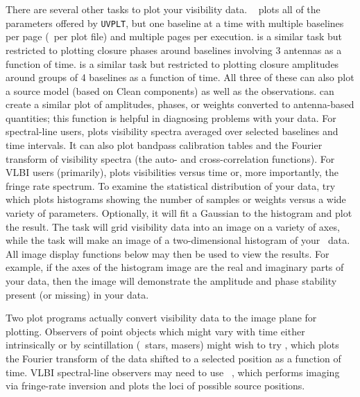      There are several other tasks to plot your visibility data.  {\tt
{}} plots all of the parameters offered by {\tt UVPLT}, but
one baseline at a time with multiple baselines per page (\ie\ per plot
file) and multiple pages per execution.  {\tt {}} is a
similar task but restricted to plotting closure phases around baselines
involving 3 antennas as a function of time.  {\tt {}} is a
similar task but restricted to plotting closure amplitudes around
groups of 4 baselines as a function of time.  All three of these
can also plot a source model (based on Clean components) as well as
the observations.  {\tt {}} can create a similar plot of
amplitudes, phases, or weights converted to antenna-based quantities;
this function is helpful in diagnosing problems with your data.  For
spectral-line users, {\tt {}} plots visibility spectra
averaged over selected baselines and time intervals.  It can also plot
bandpass calibration tables and the Fourier transform of visibility
spectra (the auto- and cross-correlation functions).  For VLBI users
(primarily), {\tt {}} plots visibilities versus time or,
more importantly, the fringe rate spectrum.  To examine the
statistical distribution of your data, try {\tt {}} which
plots histograms showing the number of samples or weights versus a
wide variety of parameters. Optionally, it will fit a Gaussian to the
histogram and plot the result.  The task {\tt {}} will grid
visibility data into an image on a variety of axes, while the task
{\tt {}} will make an image of a two-dimensional histogram
of your \uv\ data.  All image display functions below may then be used
to view the results.  For example, if the axes of the histogram image
are the real and imaginary parts of your data, then the image will
demonstrate the amplitude and phase stability present (or missing) in
your data.

     Two plot programs actually convert visibility data to the image
plane for plotting.   Observers of point objects which might vary with
time either intrinsically or by scintillation (\eg\ stars, masers)
might wish to try {\tt {}}, which plots the Fourier
transform of the data shifted to a selected position as a function of
time.  VLBI spectral-line observers may need to use {\tt
{}}, which performs imaging via fringe-rate inversion and
plots the loci of possible source positions.


